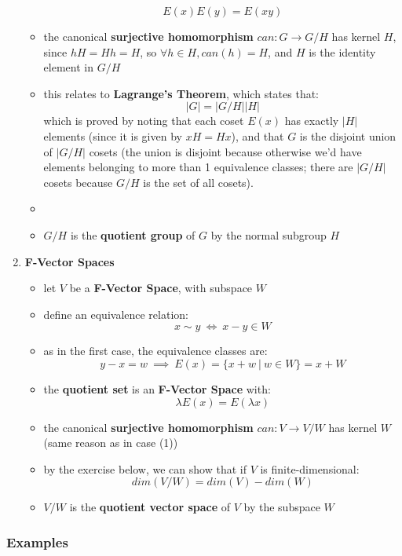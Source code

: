 \documentclass{exam}
\begin{document}
\begin{enumerate}
\begin{itemize}
        \[
        E(x)E(y) = E(xy)
        \]
        \item the canonical \textbf{surjective homomorphism} $can : G \to G / H$ has kernel $H$, since $hH = Hh = H$, so $\forall h \in H, can(h) = H$, and $H$ is the identity element in $G/H$
        \item this relates to \textbf{Lagrange's Theorem}, which states that:
        \[
        |G| = |G/H||H|
        \]
        which is proved by noting that each coset $E(x)$ has exactly $|H|$ elements (since it is given by $xH = Hx$), and that $G$ is the
        disjoint union of $|G/H|$ cosets (the union is disjoint because otherwise we'd have elements belonging to more than 1 equivalence classes; there are $|G/H|$ cosets because $G/H$ is the set of all cosets).
        \item \item $G / H$ is the \textbf{quotient group} of $G$ by the normal subgroup $H$
    \end{itemize}
    \item \textbf{F-Vector Spaces}
    \begin{itemize}
        \item let $V$ be a \textbf{F-Vector Space}, with subspace $W$
        \item define an equivalence relation:
        \[
        x \sim y \ \iff \ x - y \in W
        \]
        \item as in the first case, the equivalence classes are:
        \[
        y - x = w \ \implies \ E(x) = \{x + w \ | \ w \in W\} = x + W
        \]
        \item the \textbf{quotient set} is an \textbf{F-Vector Space} with:
        \[
        \lambda E(x) = E(\lambda x)
        \]
        \item the canonical \textbf{surjective homomorphism} $can : V \to V/W$ has kernel $W$ (same reason as in case (1))
        \item by the exercise below, we can show that if $V$ is finite-dimensional:
        \[
        dim(V/W) = dim(V) - dim(W)
        \]
        \item $V/W$ is the \textbf{quotient vector space} of $V$ by the subspace $W$
    \end{itemize}
\end{enumerate}

\subsubsection{Examples}
\end{document}
